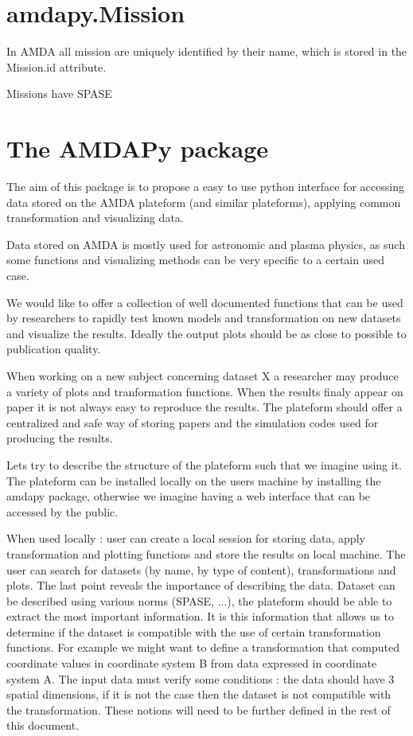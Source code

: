 \documentclass[a4paper,11pt]{report}
\begin{document}
\section{amdapy.Mission}

In AMDA all mission are uniquely identified by their name, which is stored in the Mission.id attribute.

Missions have SPASE

\section{The AMDAPy package}
The aim of this package is to propose a easy to use python interface for accessing data stored on
the AMDA plateform (and similar plateforms), applying common transformation and visualizing data.

Data stored on AMDA is mostly used for astronomic and plasma physics, as such some functions and
visualizing methods can be very specific to a certain used case.

We would like to offer a collection of well documented functions that can be used by researchers to
rapidly test known models and transformation on new datasets and visualize the results. Ideally the 
output plots should be as close to possible to publication quality.

When working on a new subject concerning dataset X a researcher may produce a variety of plots
and tranformation functions. When the results finaly appear on paper it is not always easy to
reproduce the results. The plateform should offer a centralized and safe way of storing papers
and the simulation codes used for producing the results.

Lets try to describe the structure of the plateform such that we imagine using it. The plateform 
can be installed locally on the users machine by installing the amdapy package, otherwise we imagine 
having a web interface that can be accessed by the public.

When used locally : user can create a local session for storing data, apply transformation and plotting 
functions and store the results on local machine. The user can search for datasets (by name, by type of 
content), transformations and plots. The last point reveals the importance of describing the data. 
Dataset can be described using various norms (SPASE, ...), the plateform should be able to extract the
most important information. It is this information that allows us to determine if the dataset is
compatible with the use of certain transformation functions. For example we might want to define a 
transformation that computed coordinate values in coordinate system B from data expressed in 
coordinate system A. The input data must verify some conditions : the data should have 3 spatial 
dimensions, if it is not the case then the dataset is not compatible with the transformation. These
notions will need to be further defined in the rest of this document.
\end{document}

